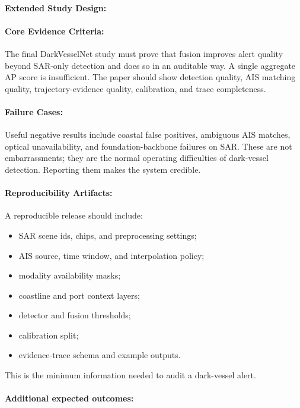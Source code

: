 \documentclass{article}
\begin{document}
\paragraph{Extended Study Design:}

\paragraph{Core Evidence Criteria:}

The final DarkVesselNet study must prove that fusion improves alert quality beyond SAR-only detection and does so in an auditable way. A single aggregate AP score is insufficient. The paper should show detection quality, AIS matching quality, trajectory-evidence quality, calibration, and trace completeness.

\paragraph{Failure Cases:}

Useful negative results include coastal false positives, ambiguous AIS matches, optical unavailability, and foundation-backbone failures on SAR. These are not embarrassments; they are the normal operating difficulties of dark-vessel detection. Reporting them makes the system credible.

\paragraph{Reproducibility Artifacts:}

A reproducible release should include:
\begin{itemize}
  \item SAR scene ids, chips, and preprocessing settings;
  \item AIS source, time window, and interpolation policy;
  \item modality availability masks;
  \item coastline and port context layers;
  \item detector and fusion thresholds;
  \item calibration split;
  \item evidence-trace schema and example outputs.
\end{itemize}
This is the minimum information needed to audit a dark-vessel alert.

\paragraph{Additional expected outcomes:}
\end{document}
